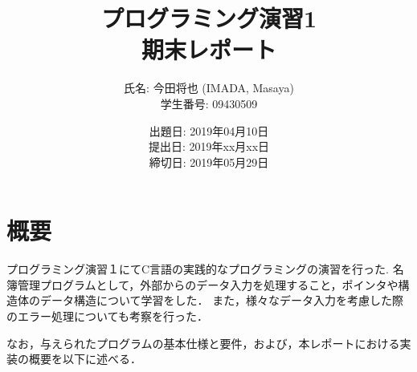 \documentclass[a4j,11pt]{jarticle}
\title{プログラミング演習1 \\
       期末レポート}
\author{氏名: 今田将也 (IMADA, Masaya) \\
        学生番号: 09430509}
\date{出題日: 2019年04月10日 \\
      提出日: 2019年xx月xx日 \\
      締切日: 2019年05月29日 \\}  %
\begin{document}
\maketitle



\section{概要}

プログラミング演習１にてC言語の実践的なプログラミングの演習を行った. 
名簿管理プログラムとして，外部からのデータ入力を処理すること，ポインタや構造体のデータ構造について学習をした．
また，様々なデータ入力を考慮した際のエラー処理についても考察を行った．

なお，与えられたプログラムの基本仕様と要件，および，本レポートにおける実装の概要を以下に述べる．
\end{document}
